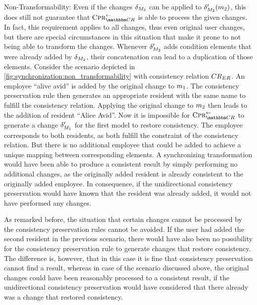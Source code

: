 \begin{properdescription}
    \item[Non-Transformability:] Even if the changes $\delta_{M_{2}}$ can be applied to $\delta_{M_{2}}'(m_{2})$, this does still not guarantee that $\consistencypreservationrule{\consistencyrelationset{CR}}^{\leftarrow}$ is able to process the given changes.
    In fact, this requirement applies to all changes, thus even original user changes, but there are special circumstances in this situation that make it prone to not being able to transform the changes.
    Whenever $\delta_{M_{2}}'$ adds condition elements that were already added by $\delta_{M_{2}}$, their concatenation can lead to a duplication of those elements.
    Consider the scenario depicted in \autoref{fig:synchronization:non_transformability} with consistency relation $CR_{ER}$. 
    An employee \enquote{alive avid} is added by the original change to $m_{1}$.
    The consistency preservation rule then generates an appropriate resident with the same name to fulfill the consistency relation.
    Applying the original change to $m_{2}$ then leads to the addition of resident \enquote{Alice Avid}.
    Now it is impossible for $\consistencypreservationrule{\consistencyrelationset{CR}}^{\leftarrow}$ to generate a change $\delta_{M_{1}}'$ for the first model to restore consistency. The employee corresponds to both residents, as both fulfill the constraint of the consistency relation. 
    But there is no additional employee that could be added to achieve a unique mapping between corresponding elements.
    A synchronizing transformation would have been able to produce a consistent result by simply performing no additional changes, as the originally added resident is already consistent to the originally added employee.
    In consequence, if the unidirectional consistency preservation would have known that the resident was already added, it would not have performed any changes.
\end{properdescription}

As remarked before, the situation that certain changes cannot be processed by the consistency preservation rules cannot be avoided. 
If the user had added the second resident in the previous scenario, there would have also been no possibility for the consistency preservation rule to generate changes that restore consistency.
The difference is, however, that in this case it is fine that consistency preservation cannot find a result, whereas in case of the scenario discussed above, the original changes could have been reasonably processed to a consistent result, if the unidirectional consistency preservation would have considered that there already was a change that restored consistency.

